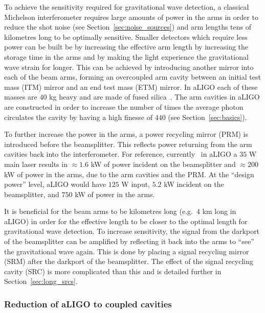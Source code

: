 \documentclass[aps,pra,superscriptaddress,reprint,nofootinbib]{revtex4-1}
\begin{document}
To achieve the sensitivity required for gravitational wave detection, a classical Michelson interferometer requires large amounts of power in the arms in order to reduce the shot noise (see Section~\ref{sec:noise_sources}) and arm lengths tens of kilometres long to be optimally sensitive.
Smaller detectors which require less power can be built be by increasing the effective arm length by increasing the storage time in the arms and by making the light experience the gravitational wave strain for longer. This can be achieved by introducing another mirror into each of the beam arms, forming an overcoupled arm cavity between an initial test mass (ITM) mirror and an end test mass (ETM) mirror. In aLIGO each of these masses are 40 kg heavy and are made of fused silica~\cite{AdvancedLIGO:2015}. The arm cavities in aLIGO are constructed in order to increase the number of times the average photon circulates the cavity by having a high finesse of $440$ (see Section~\ref{sec:basics}).


To further increase the power in the arms, a power recycling mirror (PRM) is introduced before the beamsplitter. This reflects power returning from the arm cavities back into the interferometer. For reference, currently~\cite{Buikema_2020} in aLIGO a $35$ W main laser results in $\approx 1.6$ kW of power incident on the beamsplitter and $\approx 200$ kW of power in the arms, due to the arm cavities and the PRM. At the ``design power'' level, aLIGO would have $125$ W input, $5.2$ kW incident on the beamsplitter, and $750$ kW of power in the arms.


It is beneficial for the beam arms to be kilometres long (e.g.\ $4$ km long in aLIGO) in order for the effective length to be closer to the optimal length for gravitational wave detection. To increase sensitivity, the signal from the darkport of the beamsplitter can be amplified by reflecting it back into the arms to ``see'' the gravitational wave again. This is done by placing a signal recycling mirror (SRM) after the darkport of the beamsplitter. The effect of the signal recycling cavity (SRC) is more complicated than this and is detailed further in Section~\ref{sec:long_srcs}.


\subsubsection{Reduction of aLIGO to coupled cavities}
\end{document}
